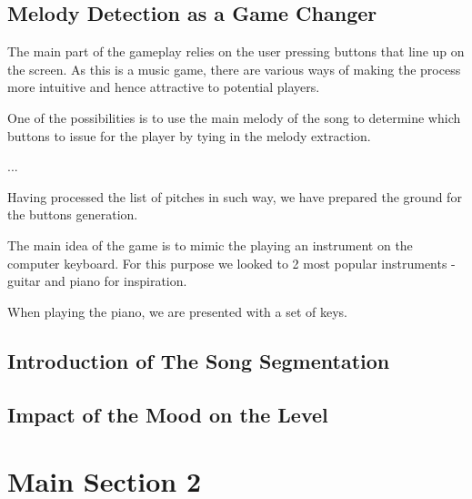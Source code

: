 \subsection{Melody Detection as a Game Changer}

The main part of the gameplay relies on the user pressing buttons that line up on the screen. As this is a music game, there are various ways of making the process more intuitive and hence attractive to potential players. 

One of the possibilities is to use the main melody of the song to determine which buttons to issue for the player by tying in the melody extraction.


...

Having processed the list of pitches in such way, we have prepared the ground for the buttons generation.

The main idea of the game is to mimic the playing an instrument on the computer keyboard. For this purpose we looked to 2 most popular instruments - guitar and piano for inspiration. 

When playing the piano, we are presented with a set of keys. 

\vspace{10pt}

\subsection{Introduction of The Song Segmentation}

\vspace{10pt}

\subsection{Impact of the Mood on the Level}

\vspace{20pt}


\section{Main Section 2}
